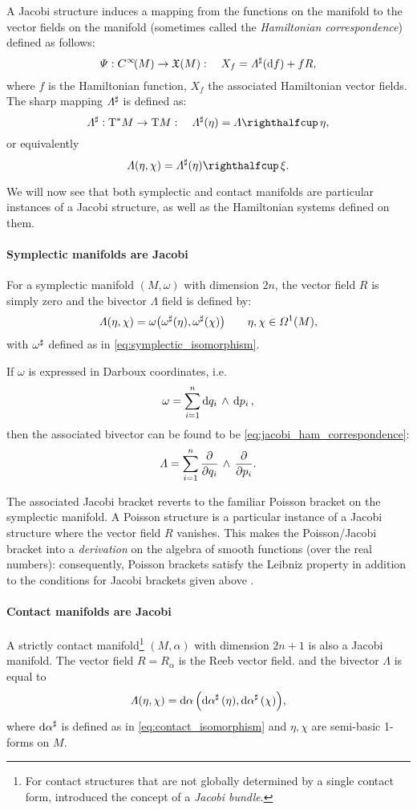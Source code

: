 A Jacobi structure induces a mapping from the functions on the manifold to the vector fields on the manifold (sometimes called the \emph{Hamiltonian correspondence}) \cite{ciaglia2018,mahmood2012} defined as follows:
\begin{equation} 
    \Psi: C^\infty\!\qty(M) \to \mathfrak{X}\qty(M): \quad X_f = \Lambda^\sharp(\dd{f}) + f R,
    \label{eq:jacobi_ham_correspondence}
\end{equation}
where $f$ is the Hamiltonian function, $X_f$ the associated Hamiltonian vector fields. The sharp mapping $\Lambda^\sharp$ is defined as:
$$ \fromDual{\Lambda}: \ctbundle{M} \to \tbundle{M}: \quad \fromDual{\Lambda}(\eta) = \intpr{\Lambda}{\eta}, $$
or equivalently
$$ \Lambda(\eta, \chi)  = \intpr{\fromDual{\Lambda}(\eta)}{\xi}. $$

We will now see that both symplectic and contact manifolds are particular instances of a Jacobi structure, as well as the Hamiltonian systems defined on them.

\paragraph{Symplectic manifolds are Jacobi}
For a symplectic manifold $(M, \omega)$ with dimension $2n$, the vector field $R$ is simply zero and the bivector $\Lambda$ field is defined by:
$$ \Lambda(\eta, \chi) = \omega\qty(\omega^\sharp(\eta), \omega^\sharp(\chi)) \qquad \eta, \chi \in \Omega^{1}(M), $$
with $\omega^\sharp$ defined as in \cref{eq:symplectic_isomorphism}. 

If $\omega$ is expressed in Darboux coordinates, i.e.
$$ \omega = \sum^n_{i = 1}  \dd{q_i}\,\wedge\,\dd{p_i} ,$$
then the associated bivector can be found to be \cref{eq:jacobi_ham_correspondence}:
$$ \Lambda = \sum^n_{i = 1}  \pdv{}{q_i}\,\wedge\,\pdv{}{p_i} . $$

The associated Jacobi bracket reverts to the familiar Poisson bracket on the symplectic manifold. A Poisson structure is a particular instance of a Jacobi structure where the vector field $R$ vanishes. This makes the Poisson/Jacobi bracket into a \emph{derivation} on the algebra of smooth functions (over the real numbers): consequently, Poisson brackets satisfy the Leibniz property in addition to the conditions for Jacobi brackets given above \cite{marle1991}.

\paragraph{Contact manifolds are Jacobi}
A strictly contact manifold\footnote{For contact structures that are not globally determined by a single contact form, \citet{marle1991} introduced the concept of a \emph{Jacobi bundle}.} $(M, \alpha)$ with dimension $2n + 1$ is also a Jacobi manifold. The vector field $R = R_\alpha$ is the Reeb vector field. 
and the bivector $\Lambda$ is equal to
$$ \Lambda(\eta, \chi) = \dd{\alpha}\qty(\dd{\alpha}^\sharp(\eta), \dd{\alpha}^\sharp(\chi)), $$
where $\dd{\alpha}^\sharp$ is defined as in \cref{eq:contact_isomorphism} and $\eta,\chi$ are semi-basic 1-forms on $M$.


